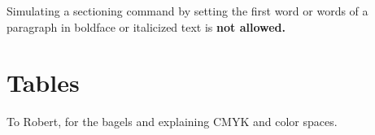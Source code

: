 \documentclass[acmtog]{acmart}
\begin{document}
Simulating a sectioning command by setting the first word or words of
a paragraph in boldface or italicized text is {\bfseries not allowed.}

\section{Tables}




\begin{acks}
To Robert, for the bagels and explaining CMYK and color spaces.
\end{acks}




\appendix
\end{document}

